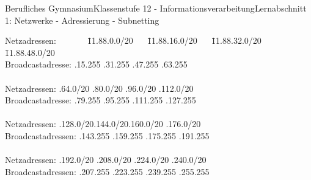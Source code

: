 \documentclass[11pt,oneside,openany,headings=optiontotoc,11pt,numbers=noenddot]{article}
\begin{document}
\begin{worksheet}{Berufliches Gymnasium}{Klassenstufe 12 - Informationsverarbeitung}{Lernabschnitt 1: Netzwerke - Adressierung - Subnetting}
		\begin{tabbing}
			Netzadressen: ~~~~~~ \= 11.88.0.0/20 ~~ \= 11.88.16.0/20 ~~ \= 11.88.32.0/20 ~~ \= 11.88.48.0/20\\
			Broadcastadresse: \> 11.88.15.255 .31.255 .47.255 .63.255\\
			\\
			Netzadressen: \> 11.88.64.0/20 .80.0/20 .96.0/20 .112.0/20\\
			Broadcastadresse: \> 11.88.79.255 .95.255 .111.255 .127.255\\
			\\
			Netzadressen: \> 11.88.128.0/20.144.0/20.160.0/20 .176.0/20\\
			Broadcastadressen: \> 11.88.143.255 .159.255 .175.255 .191.255\\
			\\
			Netzadressen: .192.0/20 .208.0/20 .224.0/20 .240.0/20\\
			Broadcastadressen: \> 11.88.207.255 .223.255 .239.255 .255.255
		\end{tabbing}
		\newpage

\end{worksheet}
\end{document}
